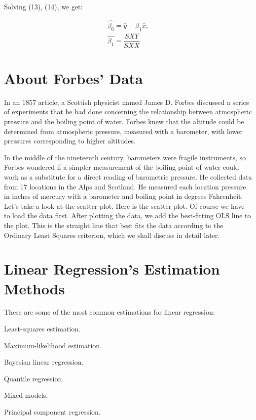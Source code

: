 \documentclass{article}
\begin{document}
    Solving (13), (14), we get:
    
    \begin{align} 
        \hat{\beta_{0}} = \overline{y} - \beta_{1}\overline{x}, 
        \\
        \hat{\beta_{1}} = \dfrac{SXY}{SXX}
    \end{align}
    
\section {About Forbes' Data}
    
    In an 1857 article, a Scottish physicist named James D. Forbes discussed a series of experiments that he had done concerning the relationship between atmospheric pressure and the boiling point of water. Forbes knew that the altitude could be determined from atmospheric pressure, measured with a barometer, with lower pressures corresponding to higher altitudes.
    
    In the middle of the nineteenth century, barometers were fragile instruments, so Forbes wondered if a simpler measurement of the boiling point of water could work as a substitute for a direct reading of barometric pressure. He collected data from 17 locations in the Alps and Scotland. He measured each location pressure in inches of mercury with a barometer and boiling point in degrees Fahrenheit. Let’s take a look at the scatter plot. Here is the scatter plot. %
    Of course we have to load the data first. After plotting the data, we add the best-fitting OLS line to the plot. This is the straight line that best fits the data according to the Ordinary Least Squares criterion, which we shall discuss in detail later.
    
\section {Linear Regression's Estimation Methods}
    
    These are some of the most common estimations for linear regression: 

    Least-squares estimation.
    
    Maximum-likelihood estimation.
    
    Bayesian linear regression.
    
    Quantile regression.
    
    Mixed models.
    
    Principal component regression.
    
\end{document}
